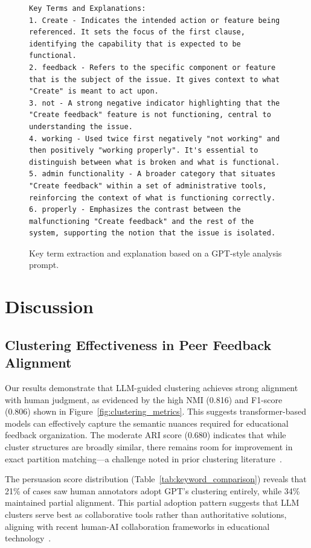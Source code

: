 \documentclass[manuscript,review, anonymous]{acmart}
\begin{document}
\begin{figure}[t]
    \centering
    \begin{minipage}{\linewidth}
        \begin{lstlisting}[style=feedbacklist]
Key Terms and Explanations:
1. Create - Indicates the intended action or feature being referenced. It sets the focus of the first clause, identifying the capability that is expected to be functional.
2. feedback - Refers to the specific component or feature that is the subject of the issue. It gives context to what "Create" is meant to act upon.
3. not - A strong negative indicator highlighting that the "Create feedback" feature is not functioning, central to understanding the issue.
4. working - Used twice first negatively "not working" and then positively "working properly". It's essential to distinguish between what is broken and what is functional.
5. admin functionality - A broader category that situates "Create feedback" within a set of administrative tools, reinforcing the context of what is functioning correctly.
6. properly - Emphasizes the contrast between the malfunctioning "Create feedback" and the rest of the system, supporting the notion that the issue is isolated.
        \end{lstlisting}
    \end{minipage}
    \caption{Key term extraction and explanation based on a GPT-style analysis prompt.}
\end{figure}


\section{Discussion}
\subsection{Clustering Effectiveness in Peer Feedback Alignment}
Our results demonstrate that LLM-guided clustering achieves strong alignment with human judgment, as evidenced by the high NMI (0.816) and F1-score (0.806) shown in Figure~\ref{fig:clustering_metrics}. This suggests transformer-based models can effectively capture the semantic nuances required for educational feedback organization. The moderate ARI score (0.680) indicates that while cluster structures are broadly similar, there remains room for improvement in exact partition matching—a challenge noted in prior clustering literature~\cite{f1_pairwise}.

The persuasion score distribution (Table~\ref{tab:keyword_comparison}) reveals that 21\% of cases saw human annotators adopt GPT's clustering entirely, while 34\% maintained partial alignment. This partial adoption pattern suggests that LLM clusters serve best as collaborative tools rather than authoritative solutions, aligning with recent human-AI collaboration frameworks in educational technology~\cite{chen2020peerstudio}.
\end{document}
